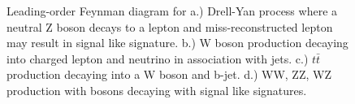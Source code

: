 \begin{figure}%
    \centering
    \qquad
    \qquad
    \qquad
    \caption{Leading-order Feynman diagram for a.) Drell-Yan process where a neutral Z boson decays to a lepton and miss-reconstructed lepton may result in signal like signature. b.) W boson production decaying into charged lepton and neutrino in association with jets. c.) $t\bar{t}$ production decaying into a W boson and b-jet. d.) WW, ZZ, WZ production with bosons decaying with signal like signatures.}%
    \label{analysis:dy-wjets}%
\end{figure}

